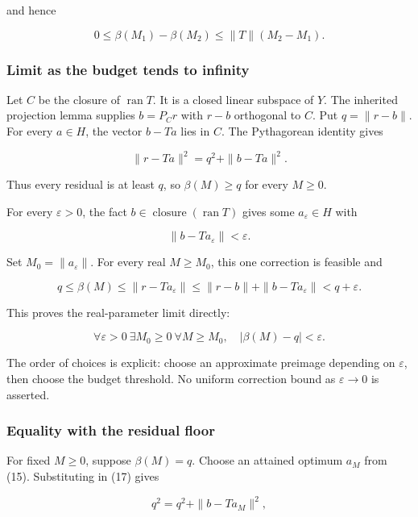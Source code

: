 \documentclass[11pt]{article}
\begin{document}
and hence

\[
0\le\beta(M_1)-\beta(M_2)\le\|T\|(M_2-M_1).        \tag{16}
\]

\hypertarget{limit-as-the-budget-tends-to-infinity}{%
\subsubsection{Limit as the budget tends to
infinity}\label{limit-as-the-budget-tends-to-infinity}}

Let \(C\) be the closure of \(\operatorname{ran} T\). It is a closed
linear subspace of \(Y\). The inherited projection lemma supplies
\(b = P_C r\) with \(r-b\) orthogonal to \(C\). Put \(q = \|r-b\|\). For
every \(a \in H\), the vector \(b-Ta\) lies in \(C\). The Pythagorean
identity gives

\[
\|r-Ta\|^2=q^2+\|b-Ta\|^2.                        \tag{17}
\]

Thus every residual is at least \(q\), so \(\beta(M) \ge q\) for every
\(M \ge 0\).

For every \(\varepsilon > 0\), the fact
\(b \in \operatorname{closure}(\operatorname{ran} T)\) gives some
\(a_{\varepsilon} \in H\) with

\[
\|b-Ta_\varepsilon\|<\varepsilon.
\]

Set \(M_0 = \|a_{\varepsilon}\|\). For every real \(M \ge M_0\), this
one correction is feasible and

\[
q\le\beta(M)\le\|r-Ta_\varepsilon\|
 \le\|r-b\|+\|b-Ta_\varepsilon\|<q+\varepsilon.
\]

This proves the real-parameter limit directly:

\[
\forall\varepsilon>0\ \exists M_0\ge0\ \forall M\ge M_0,
\quad |\beta(M)-q|<\varepsilon.
\]

The order of choices is explicit: choose an approximate preimage
depending on \(\varepsilon\), then choose the budget threshold. No
uniform correction bound as \(\varepsilon \to 0\) is asserted.

\hypertarget{equality-with-the-residual-floor}{%
\subsubsection{Equality with the residual
floor}\label{equality-with-the-residual-floor}}

For fixed \(M \ge 0\), suppose \(\beta(M) = q\). Choose an attained
optimum \(a_M\) from (15). Substituting in (17) gives

\[
q^2=q^2+\|b-Ta_M\|^2,
\]
\end{document}
